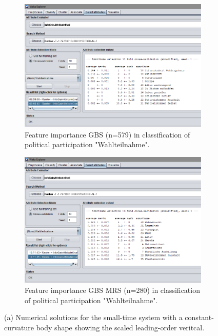 \begin{figure}
\centering
\begin{subfigure}[b]{0.8\textwidth}
		\includegraphics[scale=0.55,angle=0]{fig/weka_gbs}
   \caption{Feature importance GBS (n=579) in classification of political participation "Wahlteilnahme".}
   \label{fig:Ng1} 
\end{subfigure}

\begin{subfigure}[b]{0.8\textwidth}
\vspace{0.55cm}
		\includegraphics[scale=0.55,angle=0]{fig/weka_gesis}
   \caption{Feature importance GBS MRS (n=280) in classification of political participation "Wahlteilnahme".}
   \label{fig:Ng2}
\end{subfigure}
\vspace{0.35cm}
\caption[Two numerical solutions]{(a) Numerical solutions for the small-time system 
with a constant-curvature body shape showing the scaled leading-order veritcal.}
\end{figure}


